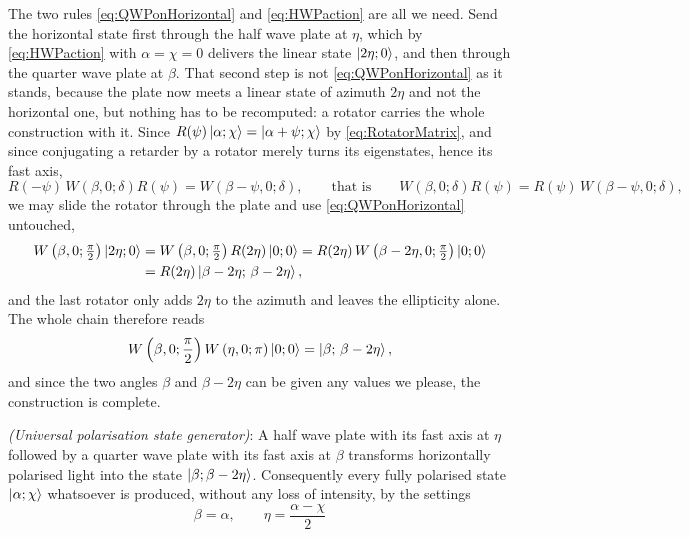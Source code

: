             The two rules \ref{eq:QWPonHorizontal} and \ref{eq:HWPaction} are all we need. Send the horizontal state first through the half wave plate at $\eta$, which by \ref{eq:HWPaction} with $\alpha=\chi=0$ delivers the linear state $\ket{2\eta;0}$, and then through the quarter wave plate at $\beta$. That second step is not \ref{eq:QWPonHorizontal} as it stands, because the plate now meets a linear state of azimuth $2\eta$ and not the horizontal one, but nothing has to be recomputed: a rotator carries the whole construction with it. Since $R(\psi)\ket{\alpha;\chi}=\ket{\alpha+\psi;\chi}$ by \ref{eq:RotatorMatrix}, and since conjugating a retarder by a rotator merely turns its eigenstates, hence its fast axis,
            \begin{equation}\label{eq:RetarderCovariance}
                R(-\psi)\,W\left(\beta,0;\delta\right)R(\psi) = W\left(\beta-\psi,0;\delta\right), \qquad\text{that is}\qquad W\left(\beta,0;\delta\right)R(\psi) = R(\psi)\,W\left(\beta-\psi,0;\delta\right),
            \end{equation}
            we may slide the rotator through the plate and use \ref{eq:QWPonHorizontal} untouched,
            \begin{align*}
                W\left(\beta,0;\tfrac{\pi}{2}\right)\ket{2\eta;0} &= W\left(\beta,0;\tfrac{\pi}{2}\right)R(2\eta)\ket{0;0} = R(2\eta)\,W\left(\beta-2\eta,0;\tfrac{\pi}{2}\right)\ket{0;0} \\
                &= R(2\eta)\ket{\beta-2\eta;\,\beta-2\eta},
            \end{align*}
            and the last rotator only adds $2\eta$ to the azimuth and leaves the ellipticity alone. The whole chain therefore reads
            \begin{equation}\label{eq:GeneratorChain}
                W\left(\beta,0;\frac{\pi}{2}\right)W\left(\eta,0;\pi\right)\ket{0;0} = \ket{\beta;\,\beta-2\eta},
            \end{equation}
            and since the two angles $\beta$ and $\beta-2\eta$ can be given any values we please, the construction is complete.

            \begin{myteo}
                \textit{(Universal polarisation state generator)}: A half wave plate with its fast axis at $\eta$ followed by a quarter wave plate with its fast axis at $\beta$ transforms horizontally polarised light into the state $\ket{\beta;\beta-2\eta}$. Consequently every fully polarised state $\ket{\alpha;\chi}$ whatsoever is produced, without any loss of intensity, by the settings
                \begin{equation}\label{eq:GeneratorRecipe}
                    \boxed{\;\beta = \alpha, \qquad \eta = \frac{\alpha-\chi}{2}\;}
                \end{equation}
            \end{myteo}

